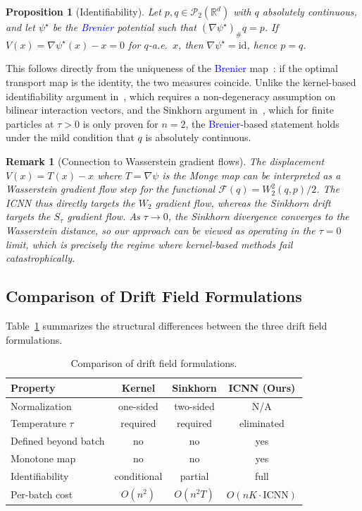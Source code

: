 \documentclass[10pt,conference,compsocconf]{IEEEtran}
\newtheorem{proposition}{Proposition}
\newtheorem{remark}{Remark}
\newcommand{\R}{\mathbb{R}}
\begin{document}
\begin{proposition}[Identifiability]\label{prop:ident}
Let $p, q \in \mathcal{P}_2(\R^d)$ with $q$ absolutely continuous, and let $\psi^\star$ be the \textcolor{blue}{Brenier} potential such that $(\nabla\psi^\star)_\# q = p$.
If $V(x) = \nabla\psi^\star(x) - x = 0$ for $q$-a.e.\ $x$, then $\nabla\psi^\star = \mathrm{id}$, hence $p = q$.
\end{proposition}
This follows directly from the uniqueness of the \textcolor{blue}{Brenier} map~\cite{brenier1991polar,villani2009optimal}: if the optimal transport map is the identity, the two measures coincide.
Unlike the kernel-based identifiability argument in~\cite{deng2026drifting}, which requires a non-degeneracy assumption on bilinear interaction vectors, and the Sinkhorn argument in~\cite{he2026sinkhorn}, which for finite particles at $\tau > 0$ is only proven for $n = 2$, the \textcolor{blue}{Brenier}-based statement holds under the mild condition that $q$ is absolutely continuous.

\begin{remark}[Connection to Wasserstein gradient flows]
The displacement $V(x) = T(x) - x$ where $T = \nabla\psi$ is the Monge map can be interpreted as a Wasserstein gradient flow step for the functional $\mathcal{F}(q) = W_2^2(q, p)/2$.
The ICNN thus directly targets the $W_2$ gradient flow, whereas the Sinkhorn drift targets the $S_\tau$ gradient flow.
As $\tau \to 0$, the Sinkhorn divergence converges to the Wasserstein distance, so our approach can be viewed as operating in the $\tau = 0$ limit, which is precisely the regime where kernel-based methods fail catastrophically.
\end{remark}


\subsection{Comparison of Drift Field Formulations}

Table~\ref{tab:comparison} summarizes the structural differences between the three drift field formulations.

\begin{table}[t]
\centering
\caption{Comparison of drift field formulations.}
\label{tab:comparison}
\small
\begin{tabular}{@{}lccc@{}}
\toprule
Property & Kernel & Sinkhorn & ICNN (Ours) \\
\midrule
Normalization & one-sided & two-sided & N/A \\
Temperature $\tau$ & required & required & eliminated \\
Defined beyond batch & no & no & yes \\
Monotone map & no & no & yes \\
Identifiability & conditional & partial & full \\
Per-batch cost & $O(n^2)$ & $O(n^2 T)$ & $O(nK\cdot\text{ICNN})$ \\
\bottomrule
\end{tabular}
\end{table}
\end{document}

